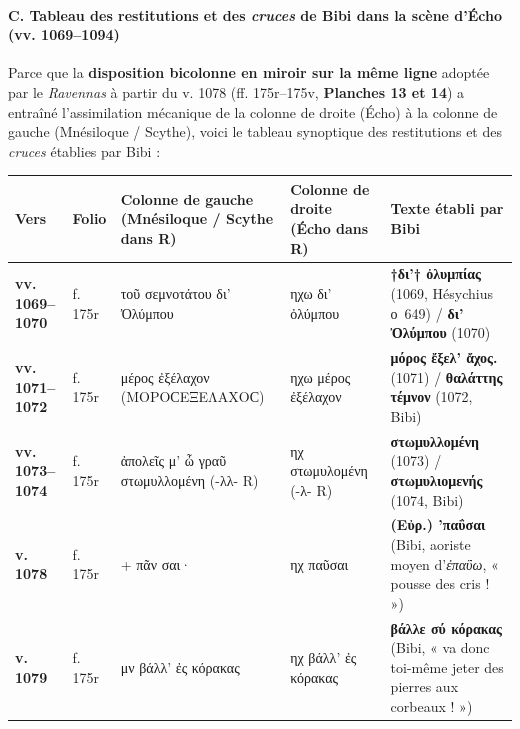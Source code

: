 \documentclass[11pt, a4paper, twoside]{article}
\renewcommand{\_}{\origunderscore\penalty0\relax}
\renewcommand{\texttt}[1]{#1}
\newcommand{\R}{\textbf{R}}
\newcommand{\Bibi}{\textit{Bibi}}
\def\R{R}%
\def\Bibi{Bibi}%
\begin{document}
\paragraph*{C. Tableau des restitutions et des \textit{cruces} de \Bibi{} dans la scène d'Écho (\texttt{vv. 1069–1094})}

Parce que la \textbf{disposition bicolonne en miroir sur la même ligne} adoptée par le \textit{Ravennas} à partir du v. 1078 (\texttt{ff. 175r–175v}, \textbf{Planches 13 et 14}) a entraîné l'assimilation mécanique de la colonne de droite (Écho) à la colonne de gauche (Mnésiloque / Scythe), voici le tableau synoptique des restitutions et des \textit{cruces} établies par \Bibi{} :

{\small
\begin{longtable}{@{}>{\raggedright\arraybackslash}p{} >{\raggedright\arraybackslash}p{} >{\raggedright\arraybackslash}p{} >{\raggedright\arraybackslash}p{} >{\raggedright\arraybackslash}p{}@{}}
\toprule
\textbf{Vers} & \textbf{Folio} & \textbf{Colonne de gauche (Mnésiloque / Scythe dans \R{})} & \textbf{Colonne de droite (Écho dans \R{})} & \textbf{Texte établi par \Bibi{}} \\
\midrule
\endhead
\bottomrule
\endfoot
\textbf{vv. 1069–1070} & \texttt{f. 175r} & \texttt{τοῦ σεμνοτάτου δι' Ὀλύμπου} & \texttt{ηχω δι' ὀλύμπου} & \textbf{\texttt{†δι'† ὀλυμπίας}} (1069, Hésychius ο~649) / \textbf{\texttt{δι' Ὀλύμπου}} (1070) \\
\addlinespace[3pt]
\textbf{vv. 1071–1072} & \texttt{f. 175r} & \texttt{μέρος ἐξέλαχον} (\texttt{ΜΟΡΟϹΕΞΕΛΑΧΟϹ}) & \texttt{ηχω μέρος ἐξέλαχον} & \textbf{\texttt{μόρος ἔξελ' ἄχος.}} (1071) / \textbf{\texttt{θαλάττης τέμνον}} (1072, \Bibi{}) \\
\addlinespace[3pt]
\textbf{vv. 1073–1074} & \texttt{f. 175r} & \texttt{ἀπολεῖς μ' ὦ γραῦ στωμυλλομένη} (\texttt{-λλ-} \R{}) & \texttt{ηχ στωμυλομένη} (\texttt{-λ-} \R{}) & \textbf{\texttt{στωμυλλομένη}} (1073) / \textbf{\texttt{στωμυλιομενής}} (1074, \Bibi{}) \\
\addlinespace[3pt]
\textbf{v. 1078} & \texttt{f. 175r} & \texttt{+ πᾶν σαι·} & \texttt{ηχ παῦσαι} & \textbf{\texttt{(Εὐρ.) 'παΰσαι}} (\Bibi{}, aoriste moyen d'\textit{ἐπαΰω}, « pousse des cris ! ») \\
\addlinespace[3pt]
\textbf{v. 1079} & \texttt{f. 175r} & \texttt{μν βάλλ' ἐς κόρακας} & \texttt{ηχ βάλλ' ἐς κόρακας} & \textbf{\texttt{βάλλε σύ κόρακας}} (\Bibi{}, « va donc toi-même jeter des pierres aux corbeaux ! ») \\

\end{longtable}}
\end{document}
